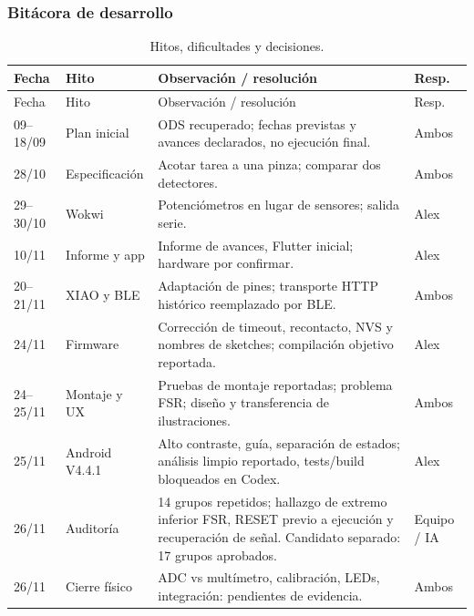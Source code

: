 \documentclass[11pt,letterpaper]{article}
\begin{document}
\subsubsection{Bitácora de desarrollo}
\begin{longtable}{@{}p{19mm}p{37mm}p{77mm}p{15mm}@{}}\caption{Hitos, dificultades y decisiones.}\label{tab:log}\\\toprule Fecha & Hito & Observación / resolución & Resp.\\\midrule\endfirsthead\toprule Fecha & Hito & Observación / resolución & Resp.\\\midrule\endhead
09--18/09 & Plan inicial & ODS recuperado; fechas previstas y avances declarados, no ejecución final. & Ambos\\
28/10 & Especificación & Acotar tarea a una pinza; comparar dos detectores. & Ambos\\
29--30/10 & Wokwi & Potenciómetros en lugar de sensores; salida serie. & Alex\\
10/11 & Informe y app & Informe de avances, Flutter inicial; hardware por confirmar. & Alex\\
20--21/11 & XIAO y BLE & Adaptación de pines; transporte HTTP histórico reemplazado por BLE. & Ambos\\
24/11 & Firmware & Corrección de timeout, recontacto, NVS y nombres de sketches; compilación objetivo reportada. & Alex\\
24--25/11 & Montaje y UX & Pruebas de montaje reportadas; problema FSR; diseño y transferencia de ilustraciones. & Ambos\\
25/11 & Android V4.4.1 & Alto contraste, guía, separación de estados; análisis limpio reportado, tests/build bloqueados en Codex. & Alex\\
26/11 & Auditoría & 14 grupos repetidos; hallazgo de extremo inferior FSR, RESET previo a ejecución y recuperación de señal. Candidato separado: 17 grupos aprobados. & Equipo / IA\\
26/11 & Cierre físico & ADC vs multímetro, calibración, LEDs, integración: pendientes de evidencia. & Ambos\\\bottomrule\end{longtable}
\end{document}
